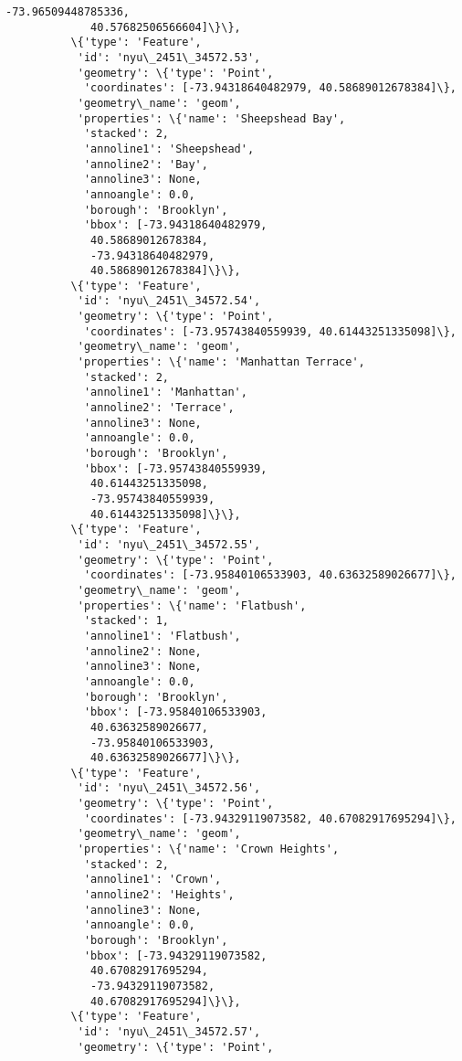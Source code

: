 \documentclass[11pt]{article}
\begin{document}
\begin{Verbatim}[commandchars=\\\{\}]
             -73.96509448785336,
             40.57682506566604]\}\},
          \{'type': 'Feature',
           'id': 'nyu\_2451\_34572.53',
           'geometry': \{'type': 'Point',
            'coordinates': [-73.94318640482979, 40.58689012678384]\},
           'geometry\_name': 'geom',
           'properties': \{'name': 'Sheepshead Bay',
            'stacked': 2,
            'annoline1': 'Sheepshead',
            'annoline2': 'Bay',
            'annoline3': None,
            'annoangle': 0.0,
            'borough': 'Brooklyn',
            'bbox': [-73.94318640482979,
             40.58689012678384,
             -73.94318640482979,
             40.58689012678384]\}\},
          \{'type': 'Feature',
           'id': 'nyu\_2451\_34572.54',
           'geometry': \{'type': 'Point',
            'coordinates': [-73.95743840559939, 40.61443251335098]\},
           'geometry\_name': 'geom',
           'properties': \{'name': 'Manhattan Terrace',
            'stacked': 2,
            'annoline1': 'Manhattan',
            'annoline2': 'Terrace',
            'annoline3': None,
            'annoangle': 0.0,
            'borough': 'Brooklyn',
            'bbox': [-73.95743840559939,
             40.61443251335098,
             -73.95743840559939,
             40.61443251335098]\}\},
          \{'type': 'Feature',
           'id': 'nyu\_2451\_34572.55',
           'geometry': \{'type': 'Point',
            'coordinates': [-73.95840106533903, 40.63632589026677]\},
           'geometry\_name': 'geom',
           'properties': \{'name': 'Flatbush',
            'stacked': 1,
            'annoline1': 'Flatbush',
            'annoline2': None,
            'annoline3': None,
            'annoangle': 0.0,
            'borough': 'Brooklyn',
            'bbox': [-73.95840106533903,
             40.63632589026677,
             -73.95840106533903,
             40.63632589026677]\}\},
          \{'type': 'Feature',
           'id': 'nyu\_2451\_34572.56',
           'geometry': \{'type': 'Point',
            'coordinates': [-73.94329119073582, 40.67082917695294]\},
           'geometry\_name': 'geom',
           'properties': \{'name': 'Crown Heights',
            'stacked': 2,
            'annoline1': 'Crown',
            'annoline2': 'Heights',
            'annoline3': None,
            'annoangle': 0.0,
            'borough': 'Brooklyn',
            'bbox': [-73.94329119073582,
             40.67082917695294,
             -73.94329119073582,
             40.67082917695294]\}\},
          \{'type': 'Feature',
           'id': 'nyu\_2451\_34572.57',
           'geometry': \{'type': 'Point',

\end{Verbatim}
\end{document}
